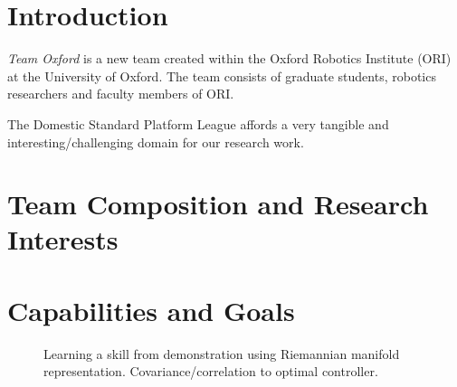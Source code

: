 \documentclass[runningheads,a4paper]{llncs}
\begin{document}
\section{Introduction}
\textit{Team Oxford} is a new team created within the Oxford Robotics Institute
(ORI) at the University of Oxford. The team consists of graduate students,
robotics researchers and faculty members of ORI.


The Domestic Standard Platform League affords a very tangible and 
interesting/challenging domain for our research work.

\section{Team Composition and Research Interests}

\section{Capabilities and Goals}

\begin{figure}[!ht]
	\centering
	\caption{Learning a skill from demonstration using Riemannian manifold representation. Covariance/correlation to optimal controller.}
	\label{fig:baxter_water_task}
\end{figure}
\end{document}
